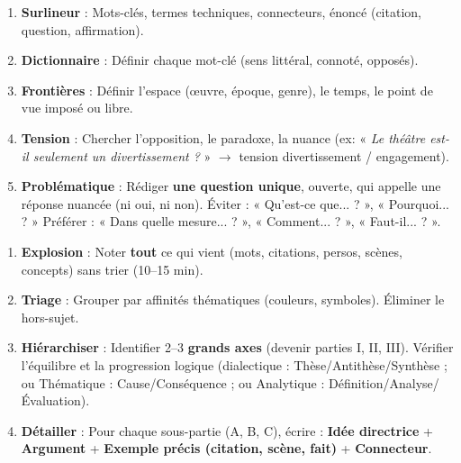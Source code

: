 \documentclass[11pt]{article}
\begin{document}
\begin{bilan}
\begin{methode}
    \begin{enumerate}
        \item \textbf{Surlineur} : Mots-clés, termes techniques, connecteurs, énoncé (citation, question, affirmation).
        \item \textbf{Dictionnaire} : Définir chaque mot-clé (sens littéral, connoté, opposés).
        \item \textbf{Frontières} : Définir l'espace (œuvre, époque, genre), le temps, le point de vue imposé ou libre.
        \item \textbf{Tension} : Chercher l'opposition, le paradoxe, la nuance (ex: « \textit{Le théâtre est-il seulement un divertissement ?} » $\to$ tension divertissement / engagement).
        \item \textbf{Problématique} : Rédiger \textbf{une question unique}, ouverte, qui appelle une réponse nuancée (ni oui, ni non). Éviter : « Qu'est-ce que... ? », « Pourquoi... ? » Préférer : « Dans quelle mesure... ? », « Comment... ? », « Faut-il... ? ».
    \end{enumerate}
\end{methode}

\begin{methode}
    \begin{enumerate}
        \item \textbf{Explosion} : Noter \textbf{tout} ce qui vient (mots, citations, persos, scènes, concepts) sans trier (10--15 min).
        \item \textbf{Triage} : Grouper par affinités thématiques (couleurs, symboles). Éliminer le hors-sujet.
        \item \textbf{Hiérarchiser} : Identifier 2--3 \textbf{grands axes} (devenir parties I, II, III). Vérifier l'équilibre et la progression logique (dialectique : Thèse/Antithèse/Synthèse ; ou Thématique : Cause/Conséquence ; ou Analytique : Définition/Analyse/Évaluation).
        \item \textbf{Détailler} : Pour chaque sous-partie (A, B, C), écrire : \textbf{Idée directrice} + \textbf{Argument} + \textbf{Exemple précis (citation, scène, fait)} + \textbf{Connecteur}.
    \end{enumerate}
\end{methode}


\end{bilan}
\end{document}
